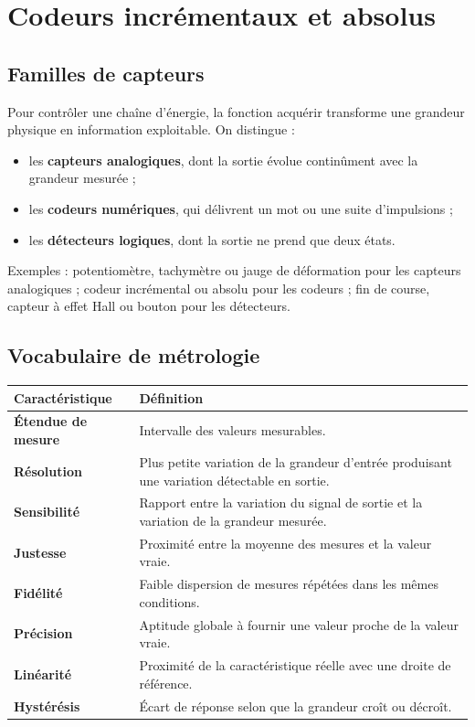 
\section{Codeurs incrémentaux et absolus}
\label{sec:codeurs}

\subsection{Familles de capteurs}

Pour contrôler une chaîne d'énergie, la fonction acquérir transforme une grandeur physique en information exploitable. On distingue :
\begin{itemize}
  \item les \textbf{capteurs analogiques}, dont la sortie évolue continûment avec la grandeur mesurée ;
  \item les \textbf{codeurs numériques}, qui délivrent un mot ou une suite d'impulsions ;
  \item les \textbf{détecteurs logiques}, dont la sortie ne prend que deux états.
\end{itemize}

Exemples : potentiomètre, tachymètre ou jauge de déformation pour les capteurs analogiques ; codeur incrémental ou absolu pour les codeurs ; fin de course, capteur à effet Hall ou bouton pour les détecteurs.

\subsection{Vocabulaire de métrologie}

\begin{center}
\small
\begin{tabularx}{\linewidth}{>{\bfseries}p{2.7cm}X}
\toprule
Caractéristique & Définition \\
\midrule
Étendue de mesure & Intervalle des valeurs mesurables.\\
Résolution & Plus petite variation de la grandeur d'entrée produisant une variation détectable en sortie.\\
Sensibilité & Rapport entre la variation du signal de sortie et la variation de la grandeur mesurée.\\
Justesse & Proximité entre la moyenne des mesures et la valeur vraie.\\
Fidélité & Faible dispersion de mesures répétées dans les mêmes conditions.\\
Précision & Aptitude globale à fournir une valeur proche de la valeur vraie.\\
Linéarité & Proximité de la caractéristique réelle avec une droite de référence.\\
Hystérésis & Écart de réponse selon que la grandeur croît ou décroît.\\
\bottomrule
\end{tabularx}
\end{center}


